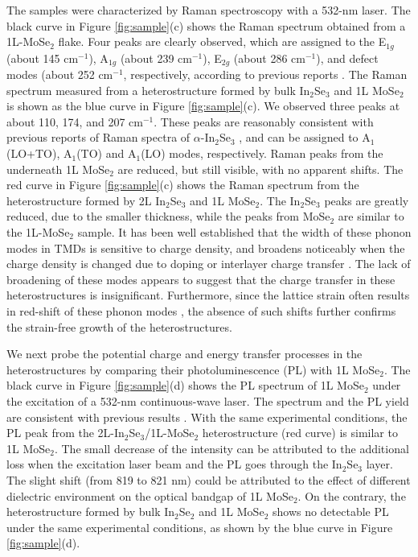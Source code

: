 \documentclass[journal=jacsat,manuscript=article]{achemso}
\begin{document}
The samples were characterized by Raman spectroscopy with a 532-nm laser. The black curve in Figure \ref{fig:sample}(c) shows the Raman spectrum obtained from a 1L-MoSe$_2$ flake. Four peaks are clearly observed, which are assigned to the E$_{1g}$ (about 145 cm$^{-1}$), A$_{1g}$ (about 239 cm$^{-1}$), E$_{2g}$ (about 286 cm$^{-1}$), and defect modes (about 252 cm$^{-1}$, respectively, according to previous reports \cite{oe214908,nanoscale64915}. The Raman spectrum measured from a heterostructure formed by bulk In$_2$Se$_3$ and 1L MoSe$_2$ is shown as the blue curve in Figure \ref{fig:sample}(c). We observed three peaks at about 110, 174, and 207  cm$^{-1}$. These peaks are reasonably consistent with previous reports of Raman spectra of $\alpha$-In$_2$Se$_3$ \cite{nl175508,nl156400}, and can be assigned to  A$_1$(LO+TO), A$_1$(TO) and A$_1$(LO) modes, respectively. Raman peaks from the underneath 1L MoSe$_2$ are reduced, but still visible, with no apparent shifts. The red curve in Figure \ref{fig:sample}(c) shows the Raman spectrum from the heterostructure formed by 2L In$_2$Se$_3$ and 1L MoSe$_2$. The In$_2$Se$_3$ peaks are greatly reduced, due to the smaller thickness, while the peaks from MoSe$_2$ are similar to the 1L-MoSe$_2$ sample. It has been well established that the width of these phonon modes in TMDs is sensitive to charge density, and broadens noticeably when the charge density is changed due to doping or interlayer charge transfer \cite{am262857,nanoscale919360}. The lack of broadening of these modes appears to suggest that the charge transfer in these heterostructures is insignificant. Furthermore, since the lattice strain often results in red-shift of these phonon modes \cite{b85161403,b88121301,nanoscale919360}, the absence of such shifts further confirms the strain-free growth of the heterostructures.

We next probe the potential charge and energy transfer processes in the heterostructures by comparing their photoluminescence (PL) with 1L MoSe$_2$. The black curve in Figure \ref{fig:sample}(d) shows the PL spectrum of 1L MoSe$_2$ under the excitation of a 532-nm continuous-wave laser. The spectrum and the PL yield are consistent with previous results \cite{oe214908,nanoscale64915}. With the same experimental conditions, the PL peak from the 2L-In$_2$Se$_3$/1L-MoSe$_2$ heterostructure (red curve) is similar to 1L MoSe$_2$. The small decrease of the intensity can be attributed to the additional loss when the excitation laser beam and the PL goes through the In$_2$Se$_3$ layer. The slight shift (from 819 to 821 nm) could be attributed to the effect of different dielectric environment on the optical bandgap of 1L MoSe$_2$. On the contrary, the heterostructure formed by bulk In$_2$Se$_2$ and 1L MoSe$_2$ shows no detectable PL under the same experimental conditions, as shown by the blue curve in Figure \ref{fig:sample}(d).
\end{document}

